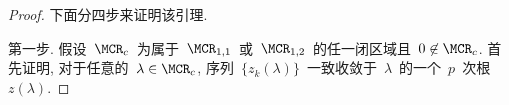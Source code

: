 \begin{proof}

下面分四步来证明该引理.


第一步.
假设~$\MCR_c$~为属于~$\MCR_{1,1}$~或~$\MCR_{1,2}$~的任一闭区域且~$0
\not\in \MCR_c$. 首先证明, 对于任意的~$\lambda \in \MCR_c$,
序列~$\{z_k(\lambda)\}$~一致收敛于~$\lambda$~的一个~$p$~次根~$z(\lambda)$.




\end{proof}
